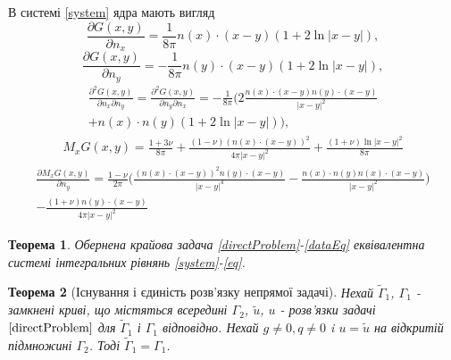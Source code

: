 \documentclass[12pt]{report}
\newtheorem{theorem}{Теорема}
\begin{document}
В системі \eqref{system} ядра мають вигляд
\begin{equation*}
 	\frac{\partial G(x,y)}{\partial n_x}=\frac{1}{8\pi}n(x)\cdot(x-y)(1+2\ln|x-y|),
 \end{equation*}
 \begin{equation*}
 	\frac{\partial G(x,y)}{\partial n_y}=-\frac{1}{8\pi}n(y)\cdot(x-y)(1+2\ln|x-y|),
 \end{equation*}
 \begin{gather*}
 	\frac{\partial^2 G(x,y)}{\partial n_x\partial n_y}=\frac{\partial^2 G(x,y)}{\partial n_y\partial n_x}=-\frac{1}{8\pi}\bigg(2\frac{n(x)\cdot(x-y)n(y)\cdot(x-y)}{|x-y|^2} \\
	+n(x)\cdot n(y)(1+2\ln|x-y|)\bigg),
 \end{gather*}
 \begin{gather*}
 	M_x G(x,y)=\frac{1+3\nu}{8\pi}+\frac{(1-\nu)(n(x)\cdot(x-y))^2}{4\pi|x-y|^2}+\frac{(1+\nu)\ln|x-y|^2}{8\pi}
 \end{gather*}
 \begin{gather*}
 	\frac{\partial M_x G(x,y)}{\partial n_y}=\frac{1-\nu}{2\pi}\Big(\frac{(n(x)\cdot(x-y))^2n(y)\cdot(x-y)}{|x-y|^4}-\frac{n(x)\cdot n(y)n(x)\cdot(x-y)}{|x-y|^2} \Big) \\
	-\frac{(1+\nu)n(y)\cdot(x-y)}{4\pi|x-y|^2}
 \end{gather*}


\begin{theorem}
Обернена крайова задача \eqref{directProblem}-\eqref{dataEq} еквівалентна системі інтегральних рівнянь \eqref{system}-\eqref{eq}.
\end{theorem}

\begin{theorem}[Існування і єдиність розв'язку непрямої задачі]

Нехай $\tilde{\Gamma}_1$, $\Gamma_1$ - замкнені криві, що містяться всередині $\Gamma_2$, $\tilde{u}$, $u$ - розв'язки задачі $\eqref{directProblem}$ для $\tilde{\Gamma}_1$ і $\Gamma_1$ відповідно. Нехай $g\neq 0, q\neq 0$ i $u = \tilde{u}$ на відкритій підмножині $\Gamma_2$. Тоді $\tilde{\Gamma}_1=\Gamma_1$.

\end{theorem}
\end{document}
